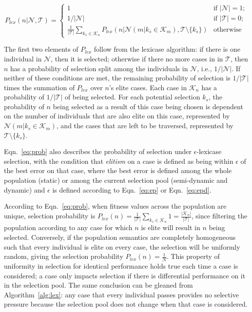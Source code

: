\documentclass[twoside]{article}
\begin{document}
\begin{equation}\label{eq:prob}
P_{lex}(n | \mathcal{N}, \mathcal{T}) =
\begin{cases}
1 & \text{if } |\mathcal{N}| = 1;\\
1/|\mathcal{N}| & \text{if } |\mathcal{T}| = 0;\\
\frac{1}{|\mathcal{T}|}\sum_{k_s \in \mathcal{K}_n}{P_{lex} \left( n | \mathcal{N}(m|k_s \in \mathcal{K}_m), \mathcal{T} \setminus \{k_s\} \right)} & \text{otherwise}
\end{cases}
\end{equation}

The first two elements of $P_{lex}$ follow from the lexicase algorithm: if there is one individual in $\mathcal{N}$, then it is selected; otherwise if there no more cases in in $\mathcal{T}$, then $n$ has a probability of selection split among the individuals in $\mathcal{N}$, i.e.,  $1/|\mathcal{N}|$. If neither of these conditions are met, the remaining probability of selection is $1/|\mathcal{T}|$ times the summation of $P_{lex}$ over $n$'s elite cases. Each case in $\mathcal{K}_n$ has a probability of $1/|\mathcal{T}|$ of being selected. For each potential selection $k_s$, the probability of $n$ being selected as a result of this case being chosen is dependent on the number of individuals that are also elite on this case, represented by $\mathcal{N}(m|k_s \in \mathcal{K}_m)$, and the cases that are left to be traversed, represented by $\mathcal{T} \setminus \{k_s\}$. 

Eqn.~\ref{eq:prob} also describes the probability of selection under $\epsilon$-lexicase selection, with the condition that {\it elitism} on a case is defined as being within $\epsilon$ of the best error on that case, where the best error is defined among the whole population (static) or among the current selection pool (semi-dynamic and dynamic) and $\epsilon$ is defined according to Eqn.~\ref{eq:ep} or Eqn.~\ref{eq:epd}. 

According to Eqn.~\ref{eq:prob}, when fitness values across the population are unique, selection probability is $P_{lex}(n) = \frac{1}{|\mathcal{T}|} \sum_{k_s \in \mathcal{K}_n} 1 = \frac{|\mathcal{K}_n|}{|\mathcal{T}|}$, since filtering the population according to any case for which $n$ is elite will result in $n$ being selected. Conversely, if the population semantics are completely homogeneous such that every individual is elite on every case, the selection will be uniformly random, giving the selection probability $P_{lex}(n) = \frac{1}{N}$. This property of uniformity in selection for identical performance holds true each time a case is considered; a case only impacts selection if there is differential performance on it in the selection pool. The same conclusion can be gleaned from Algorithm~\ref{alg:lex}: any case that every individual passes provides no selective pressure because the selection pool does not change when that case is considered.
\end{document}

